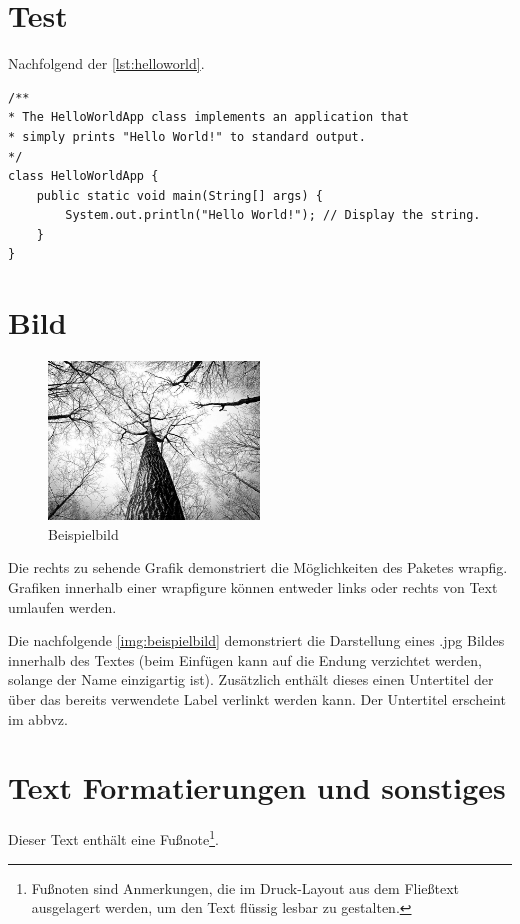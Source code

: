 \section{Test}
Nachfolgend der \autoref{lst:helloworld}.

\begin{lstlisting}[caption={Hello World}, captionpos=b, label={lst:helloworld}]
/**
* The HelloWorldApp class implements an application that
* simply prints "Hello World!" to standard output.
*/
class HelloWorldApp {
	public static void main(String[] args) {
		System.out.println("Hello World!"); // Display the string.
	}
}
\end{lstlisting}

\section{Bild}

\begin{figure}
	\centering
	\includegraphics[width=0.5\textwidth]{resources/example}
	\caption{Beispielbild {\cite{PEXELS2015}}}
\end{figure}

Die rechts zu sehende Grafik demonstriert die Möglichkeiten des Paketes \glqq wrapfig\grqq . Grafiken innerhalb einer \glqq wrapfigure\grqq{} können entweder links oder rechts von Text umlaufen werden.

Die nachfolgende \autoref{img:beispielbild} demonstriert die Darstellung eines \glqq *.jpg\grqq{} Bildes innerhalb des Textes (beim Einfügen kann auf die Endung verzichtet werden, solange der Name einzigartig ist). Zusätzlich enthält dieses einen Untertitel der über das bereits verwendete Label verlinkt werden kann. Der Untertitel erscheint im \gls{abbvz}.

\section{Text Formatierungen und sonstiges}
Dieser Text enthält eine Fußnote\footnote{Fußnoten sind Anmerkungen, die im Druck-Layout aus dem Fließtext ausgelagert werden, um den Text flüssig lesbar zu gestalten.}.

